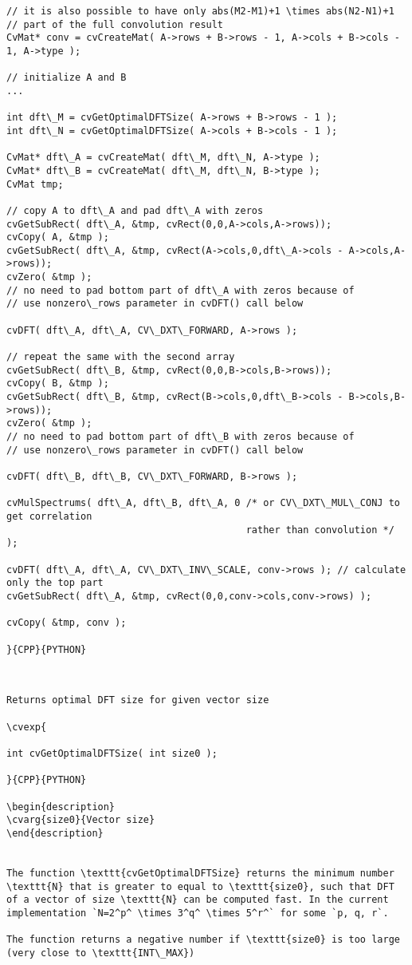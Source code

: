 \begin{verbatim}
// it is also possible to have only abs(M2-M1)+1 \times abs(N2-N1)+1
// part of the full convolution result
CvMat* conv = cvCreateMat( A->rows + B->rows - 1, A->cols + B->cols - 1, A->type );

// initialize A and B
...

int dft\_M = cvGetOptimalDFTSize( A->rows + B->rows - 1 );
int dft\_N = cvGetOptimalDFTSize( A->cols + B->cols - 1 );

CvMat* dft\_A = cvCreateMat( dft\_M, dft\_N, A->type );
CvMat* dft\_B = cvCreateMat( dft\_M, dft\_N, B->type );
CvMat tmp;

// copy A to dft\_A and pad dft\_A with zeros
cvGetSubRect( dft\_A, &tmp, cvRect(0,0,A->cols,A->rows));
cvCopy( A, &tmp );
cvGetSubRect( dft\_A, &tmp, cvRect(A->cols,0,dft\_A->cols - A->cols,A->rows));
cvZero( &tmp );
// no need to pad bottom part of dft\_A with zeros because of
// use nonzero\_rows parameter in cvDFT() call below

cvDFT( dft\_A, dft\_A, CV\_DXT\_FORWARD, A->rows );

// repeat the same with the second array
cvGetSubRect( dft\_B, &tmp, cvRect(0,0,B->cols,B->rows));
cvCopy( B, &tmp );
cvGetSubRect( dft\_B, &tmp, cvRect(B->cols,0,dft\_B->cols - B->cols,B->rows));
cvZero( &tmp );
// no need to pad bottom part of dft\_B with zeros because of
// use nonzero\_rows parameter in cvDFT() call below

cvDFT( dft\_B, dft\_B, CV\_DXT\_FORWARD, B->rows );

cvMulSpectrums( dft\_A, dft\_B, dft\_A, 0 /* or CV\_DXT\_MUL\_CONJ to get correlation
                                          rather than convolution */ );

cvDFT( dft\_A, dft\_A, CV\_DXT\_INV\_SCALE, conv->rows ); // calculate only the top part
cvGetSubRect( dft\_A, &tmp, cvRect(0,0,conv->cols,conv->rows) );

cvCopy( &tmp, conv );

}{CPP}{PYTHON}


\end{verbatim}
\begin{verbatim}

Returns optimal DFT size for given vector size

\cvexp{

int cvGetOptimalDFTSize( int size0 );

}{CPP}{PYTHON}

\begin{description}
\cvarg{size0}{Vector size}
\end{description}


The function \texttt{cvGetOptimalDFTSize} returns the minimum number \texttt{N} that is greater to equal to \texttt{size0}, such that DFT of a vector of size \texttt{N} can be computed fast. In the current implementation `N=2^p^ \times 3^q^ \times 5^r^` for some `p, q, r`.

The function returns a negative number if \texttt{size0} is too large (very close to \texttt{INT\_MAX})


\end{verbatim}
